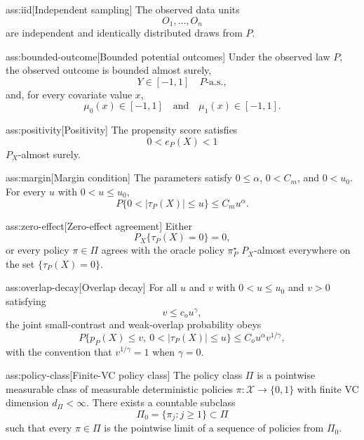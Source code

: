 \begin{assumptionv}{ass:iid}[Independent sampling]
The observed data units
\[
O_1,\ldots,O_n
\]
are independent and identically distributed draws from \(P\).
\end{assumptionv}

\begin{assumptionv}{ass:bounded-outcome}[Bounded potential outcomes]
Under the observed law \(P\), the observed outcome is bounded almost surely,
\[
Y\in[-1,1]\quad P\text{-a.s.},
\]
and, for every covariate value \(x\),
\[
\mu_0(x)\in[-1,1]\quad\text{and}\quad \mu_1(x)\in[-1,1].
\]
\end{assumptionv}

\begin{assumptionv}{ass:positivity}[Positivity]
The propensity score satisfies
\[
0<e_P(X)<1
\]
\(P_X\)-almost surely.
\end{assumptionv}

\begin{assumptionv}{ass:margin}[Margin condition]
The parameters satisfy \(0\le \alpha\), \(0<C_m\), and \(0<u_0\). For every \(u\) with \(0<u\le u_0\),
\[
P\{0<|\tau_P(X)|\le u\}\le C_m u^\alpha .
\]
\end{assumptionv}

\begin{assumptionv}{ass:zero-effect}[Zero-effect agreement]
Either
\[
P_X\{\tau_P(X)=0\}=0,
\]
or every policy \(\pi\in\Pi\) agrees with the oracle policy \(\pi^\star_P\) \(P_X\)-almost everywhere on the set \(\{\tau_P(X)=0\}\).
\end{assumptionv}

\begin{assumptionv}{ass:overlap-decay}[Overlap decay]
For all \(u\) and \(v\) with \(0<u\le u_0\) and \(v>0\) satisfying
\[
v\le c_o u^\gamma,
\]
the joint small-contrast and weak-overlap probability obeys
\[
P\{p_P(X)\le v,\ 0<|\tau_P(X)|\le u\}
   \le C_o u^\alpha v^{1/\gamma},
\]
with the convention that \(v^{1/\gamma}=1\) when \(\gamma=0\).
\end{assumptionv}

\begin{assumptionv}{ass:policy-class}[Finite-VC policy class]
The policy class \(\Pi\) is a pointwise measurable class of measurable deterministic policies \(\pi:\mathcal X\to\{0,1\}\) with finite VC dimension \(d_\Pi<\infty\).  There exists a countable subclass
\[
\Pi_0=\{\pi_j:j\ge 1\}\subset\Pi
\]
such that every \(\pi\in\Pi\) is the pointwise limit of a sequence of policies from \(\Pi_0\).
\end{assumptionv}

